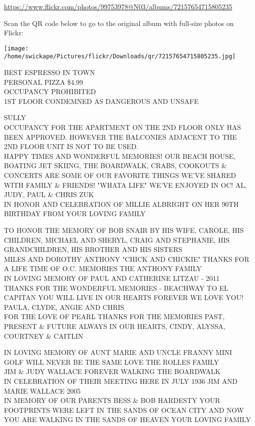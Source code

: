 \documentclass[10pt,letterpaper]{article}
\begin{document}
\url{https://www.flickr.com/photos/99753978@N03/albums/72157654715805235}

Scan the QR code below to go to the original album with full-size photos on Flickr:

\texttt{[image: /home/swickape/Pictures/flickr/Downloads/qr/72157654715805235.jpg]}
\pagebreak

BEST ESPRESSO IN TOWN\\
PERSONAL PIZZA \$4.99\\
OCCUPANCY PROHIBITED\\
1ST FLOOR CONDEMNED AS DANGEROUS AND UNSAFE

SULLY\\
OCCUPANCY FOR THE APARTMENT ON THE 2ND FLOOR ONLY HAS BEEN APPROVED.  HOWEVER THE BALCONIES ADJACENT TO THE 2ND FLOOR UNIT IS NOT TO BE USED.\\
HAPPY TIMES AND WONDERFUL MEMORIES!  OUR BEACH HOUSE, BOATING JET SKIING, THE BOARDWALK, CRABS, COOKOUTS \& CONCERTS ARE SOME OF OUR FAVORITE THINGS WE'VE SHARED WITH FAMILY \& FRIENDS!  "WHATA LIFE" WE'VE ENJOYED IN OC!  AL, JUDY, PAUL \& CHRIS ZUK\\
IN HONOR AND CELEBRATION OF MILLIE ALBRIGHT ON HER 90TH BIRTHDAY FROM YOUR LOVING FAMILY

TO HONOR THE MEMORY OF BOB SNAIR BY HIS WIFE, CAROLE, HIS CHILDREN, MICHAEL AND SHERYL, CRAIG AND STEPHANIE, HIS GRANDCHILDREN, HIS BROTHER AND HIS SISTERS\\
MILES AND DOROTHY ANTHONY "CHICK AND CHICKIE" THANKS FOR A LIFE TIME OF O.C. MEMORIES THE ANTHONY FAMILY\\
IN LOVING MEMORY OF PAUL AND CATHERINE LITZAU {-} 2011 THANKS FOR THE WONDERFUL MEMORIES {-} BEACHWAY TO EL CAPITAN YOU WILL LIVE IN OUR HEARTS FOREVER WE LOVE YOU!  PAULA, CLYDE, ANGIE AND CHRIS\\
FOR THE LOVE OF PEARL THANKS FOR THE MEMORIES PAST, PRESENT \& FUTURE ALWAYS IN OUR HEARTS, CINDY, ALYSSA, COURTNEY \& CAITLIN

IN LOVING MEMORY OF AUNT MARIE AND UNCLE FRANNY MINI GOLF WILL NEVER BE THE SAME LOVE THE ROLLES FAMILY\\
JIM \& JUDY WALLACE FOREVER WALKING THE BOARDWALK\\
IN CELEBRATION OF THEIR MEETING HERE IN JULY 1936 JIM AND MARIE WALLACE 2005\\
IN MEMORY OF OUR PARENTS BESS \& BOB HARDESTY YOUR FOOTPRINTS WERE LEFT IN THE SANDS OF OCEAN CITY AND NOW YOU ARE WALKING IN THE SANDS OF HEAVEN YOUR LOVING FAMILY
\end{document}

